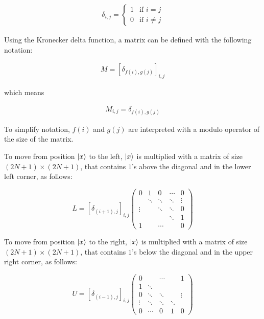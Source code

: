 \begin{align}
    \delta_{i,j} =
    \begin{cases}
      1 & \text{if $i=j$}  \\
      0 & \text{if $i\neq{}j$}
    \end{cases}
  \end{align}

Using the Kronecker delta function, a matrix can be defined with the following notation:

\begin{align}
    M = [\delta_{f(i),g(j)}]_{i,j}
\end{align}

which means

\begin{align}
M_{i,j} = \delta_{f(i),g(j)}
\end{align}

To simplify notation, $f(i)$ and $g(j)$ are interpreted with a modulo operator of the size of the matrix.


To move from position $\ket{x}$ to the left, $\ket{x}$ is multiplied with a matrix of size $(2N+1)\times(2N+1)$, that contains $1$'s above the diagonal and in the lower left corner, as follows:

\begin{center}
  \[ L = [\delta_{(i+1),j}]_{i,j}
    \left(
    \begin{array}{ccccc}
        0      & 1      & 0      & \cdots & 0      \\
               & \ddots & \ddots & \ddots & \vdots \\
        \vdots &        & \ddots & \ddots & 0      \\
               &        &        & \ddots & 1      \\
        1      &        & \cdots &        & 0
      \end{array}
    \right)
  \]
\end{center}


To move from position $\ket{x}$ to the right, $\ket{x}$ is multiplied with a matrix of size $(2N+1)\times(2N+1)$, that contains $1$'s below the diagonal and in the upper right corner, as follows:

\begin{center}
  \[ U = [\delta_{(i-1),j}]_{i,j}
    \left(
    \begin{array}{ccccc}

        0      &        & \cdots &        & 1      \\
        1      & \ddots &        &        &        \\
        0      & \ddots & \ddots &        & \vdots \\
        \vdots & \ddots & \ddots & \ddots &        \\
        0      & \cdots & 0      & 1      & 0
      \end{array}
    \right)
  \]
\end{center}

